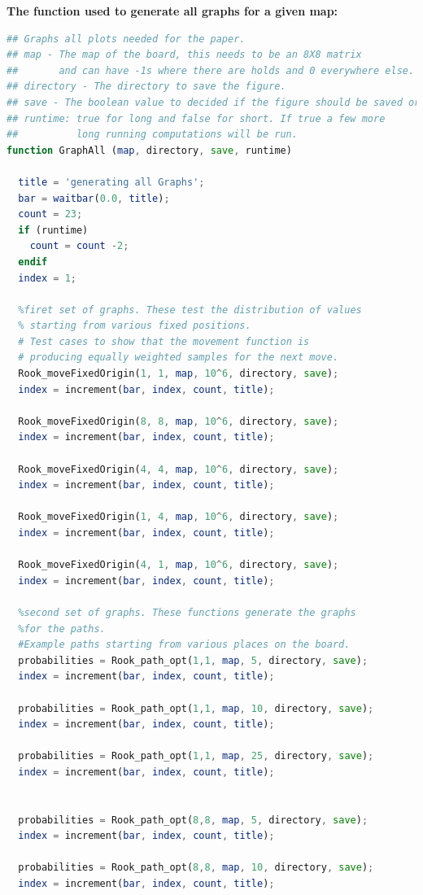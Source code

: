 \documentclass{amsart}
\numberwithin{equation}{section}
\begin{document}
\textbf{The function used to generate all graphs for a given map:}
\begin{lstlisting}[language=octave]
## Graphs all plots needed for the paper.
## map - The map of the board, this needs to be an 8X8 matrix
##       and can have -1s where there are holds and 0 everywhere else.
## directory - The directory to save the figure.
## save - The boolean value to decided if the figure should be saved or not. 
## runtime: true for long and false for short. If true a few more 
##          long running computations will be run.
function GraphAll (map, directory, save, runtime)
  
  title = 'generating all Graphs';
  bar = waitbar(0.0, title);
  count = 23;
  if (runtime)
    count = count -2;
  endif
  index = 1;
  
  %firet set of graphs. These test the distribution of values
  % starting from various fixed positions.
  # Test cases to show that the movement function is
  # producing equally weighted samples for the next move.
  Rook_moveFixedOrigin(1, 1, map, 10^6, directory, save);
  index = increment(bar, index, count, title);
  
  Rook_moveFixedOrigin(8, 8, map, 10^6, directory, save);
  index = increment(bar, index, count, title);
  
  Rook_moveFixedOrigin(4, 4, map, 10^6, directory, save);
  index = increment(bar, index, count, title);
  
  Rook_moveFixedOrigin(1, 4, map, 10^6, directory, save);
  index = increment(bar, index, count, title);
  
  Rook_moveFixedOrigin(4, 1, map, 10^6, directory, save);
  index = increment(bar, index, count, title);
  
  %second set of graphs. These functions generate the graphs
  %for the paths.
  #Example paths starting from various places on the board.
  probabilities = Rook_path_opt(1,1, map, 5, directory, save);
  index = increment(bar, index, count, title);
  
  probabilities = Rook_path_opt(1,1, map, 10, directory, save);
  index = increment(bar, index, count, title);
  
  probabilities = Rook_path_opt(1,1, map, 25, directory, save);
  index = increment(bar, index, count, title);
  
  
  probabilities = Rook_path_opt(8,8, map, 5, directory, save);
  index = increment(bar, index, count, title);
  
  probabilities = Rook_path_opt(8,8, map, 10, directory, save);
  index = increment(bar, index, count, title);
  

\end{lstlisting}
\end{document}
